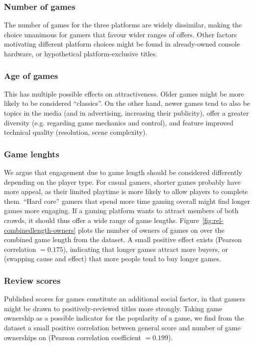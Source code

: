 \subsubsection{Number of games} The number of games for the three platforms are widely dissimilar, making the choice unanimous for gamers that favour wider ranges of offers. Other factors motivating different platform choices might be found in already-owned console hardware, or hypothetical platform-exclusive titles.

\subsubsection{Age of games} This has multiple possible effects on attractiveness. Older games might be more likely to be considered ``classics''. On the other hand, newer games tend to also be topics in the media (and in advertising, increasing their publicity), offer a greater diversity (e.g. regarding game mechanics and control), %
and feature improved technical quality (resolution, scene complexity).

\subsubsection{Game lenghts} We argue that engagement due to game length should be considered differently depending on the player type. For casual gamers, shorter games probably have more appeal, as their limited playtime is more likely to allow players to complete them. ``Hard core'' gamers that spend more time gaming overall might find longer games more engaging. If a gaming platform wants to attract members of both crowds, it should thus offer a wide range of game lengths. 
Figure~\ref{fig:rel-combinedlength-owners} plots the number of owners of games on  \steam over the combined game length from the \hltb dataset. A small positive effect exists (Pearson correlation $= 0.175$), indicating that longer games attract more buyers, or (swapping cause and effect) that more people tend to buy longer games.

\subsubsection{Review scores} Published scores for games constitute an additional social factor, in that gamers might be drawn to positively-reviewed titles more strongly. Taking game ownership as a possible indicator for the popularity of a game, we find from the \metacritic dataset a small positive correlation between general score and number of game ownerships on \steam (Pearson correlation coefficient $= 0.199$).


